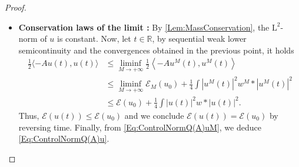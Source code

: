 \documentclass{article}
\def\R{\mathbb R}
\def\L{\mathrm L}
\def\Q{\mathrm Q}
\DeclareMathOperator{\re}{Re}
\def\d{\mathrm{d}}
\newcommand{\indic}[1]{\mathds{1}_{#1}}
\theoremstyle{definition}
\numberwithin{equation}{section}
\newcommand{\complexI}{\mathrm{i}} %
\begin{document}
\begin{proof}
\begin{itemize}
        \begin{equation}
            \langle \complexI u^M(t),\phi\rangle-\langle \complexI u_0,\phi\rangle = \int_{0}^t \left(\langle -Au^M(s),\phi\rangle - \re\int w^M*\left|u^M(s)\right|^2u^M(s)\overline{\phi}\right)\d s.
        \end{equation}
        As $u^M$ converges uniformly to $u$ in $\L^2\cap\L^4$, $\langle \complexI u^M(t),\phi\rangle$ converges to $\langle \complexI u(t),\phi\rangle$ and
        $$\int w^M*\left|u^M(t)\right|^2u^M(t)\overline{\phi}$$
        converges uniformly to
        $$\int w*\left|u(t)\right|^2u(t)\overline{\phi},$$
        by using the multilinear bound
        $$\left|\int v*(fg)h\phi\right|\leqslant|v|_{\L^2+\L^\infty}|f|_{\L^2\cap\L^4}|g|_{\L^2\cap\L^4} |h|_{\L^2}|\phi|_{\L^2}.$$
        Finally, for almost every $s\in[-T,T]$, $\langle -Au^M(s),\phi\rangle$ converges to $\langle -Au(s),\phi\rangle$ and is bounded by a constant uniform in $M$. Thus, by dominated convergence, it holds
        \begin{equation}
            \langle \complexI u(t),\phi\rangle-\langle \complexI u_0,\phi\rangle = \int_{0}^t \left(\langle -Au(s),\phi\rangle - \re\int w*\left|u(s)\right|^2u(s)\overline{\phi}\right)\d s,
        \end{equation}
        i.e. $u$ is a solution of \cref{Eq:Hartree} in $\L^\infty([-T,T],\Q(A))\subset\L^\infty([-T,T],\L^2\cap\L^4)$. Let $u_N$ be a solution of \cref{Eq:Hartree} in $\L^\infty([-N,N],\Q(A))$. By \cref{Lem:AbstractHartreeUniqueness} it is unique, thus $(u_{N+1})_{|[-N,N]}=u_N$ and
        $$u(t) = \sum_{N=1}^{+\infty} u_N(t)\indic{N-1\leqslant |t|<N}$$
        is the unique maximal $\Q(A)$-valued solution of \cref{Eq:Hartree} starting from $u_0$.
        \item \textbf{Conservation laws of the limit :} By \cref{Lem:MassConservation}, the $\L^2$-norm of $u$ is constant. Now, let $t\in\R$, by sequential weak lower semicontinuity and the convergences obtained in the previous point, it holds
        \begin{align*}
            \frac{1}{2}\langle -Au(t),u(t)\rangle &\leqslant \liminf_{M\to+\infty}\frac{1}{2}\left\langle -Au^M(t),u^M(t)\right\rangle\\
            &\leqslant \liminf_{M\to+\infty} \mathcal{E}_M(u_0) + \frac{1}{4}\int \left|u^M(t)\right|^2w^M*\left|u^M(t)\right|^2\\
            &\leqslant \mathcal{E}(u_0) + \frac{1}{4}\int \left|u(t)\right|^2w*\left|u(t)\right|^2.
        \end{align*}
        Thus, $\mathcal{E}(u(t))\leqslant\mathcal{E}(u_0)$ and we conclude $\mathcal{E}(u(t))=\mathcal{E}(u_0)$ by reversing time. Finally, from \cref{Eq:ControlNormQ(A)uM}, we deduce \cref{Eq:ControlNormQ(A)u}.
     \end{itemize}
\end{proof}
\end{document}
